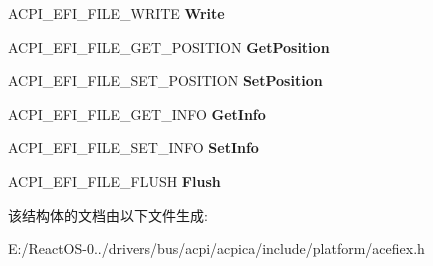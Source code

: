\begin{DoxyCompactItemize}
A\+C\+P\+I\+\_\+\+E\+F\+I\+\_\+\+F\+I\+L\+E\+\_\+\+W\+R\+I\+TE {\bfseries Write}
\item 
\mbox{\label{struct___a_c_p_i___e_f_i___f_i_l_e___h_a_n_d_l_e_ae17d787dc84428eaa390f33e2c42e971}} 
A\+C\+P\+I\+\_\+\+E\+F\+I\+\_\+\+F\+I\+L\+E\+\_\+\+G\+E\+T\+\_\+\+P\+O\+S\+I\+T\+I\+ON {\bfseries Get\+Position}
\item 
\mbox{\label{struct___a_c_p_i___e_f_i___f_i_l_e___h_a_n_d_l_e_aab0c82dc85855c02765ebdcda2b5b460}} 
A\+C\+P\+I\+\_\+\+E\+F\+I\+\_\+\+F\+I\+L\+E\+\_\+\+S\+E\+T\+\_\+\+P\+O\+S\+I\+T\+I\+ON {\bfseries Set\+Position}
\item 
\mbox{\label{struct___a_c_p_i___e_f_i___f_i_l_e___h_a_n_d_l_e_a2d76dd4a08e8b60fb5691f31a0497ab4}} 
A\+C\+P\+I\+\_\+\+E\+F\+I\+\_\+\+F\+I\+L\+E\+\_\+\+G\+E\+T\+\_\+\+I\+N\+FO {\bfseries Get\+Info}
\item 
\mbox{\label{struct___a_c_p_i___e_f_i___f_i_l_e___h_a_n_d_l_e_ae4e4690519206be09a73f6e8fce1f336}} 
A\+C\+P\+I\+\_\+\+E\+F\+I\+\_\+\+F\+I\+L\+E\+\_\+\+S\+E\+T\+\_\+\+I\+N\+FO {\bfseries Set\+Info}
\item 
\mbox{\label{struct___a_c_p_i___e_f_i___f_i_l_e___h_a_n_d_l_e_ac3d99e2c5e25ac71f806371c7c947e39}} 
A\+C\+P\+I\+\_\+\+E\+F\+I\+\_\+\+F\+I\+L\+E\+\_\+\+F\+L\+U\+SH {\bfseries Flush}
\end{DoxyCompactItemize}


该结构体的文档由以下文件生成\+:\begin{DoxyCompactItemize}
\item 
E\+:/\+React\+O\+S-\/0../drivers/bus/acpi/acpica/include/platform/acefiex.\+h\end{DoxyCompactItemize}
